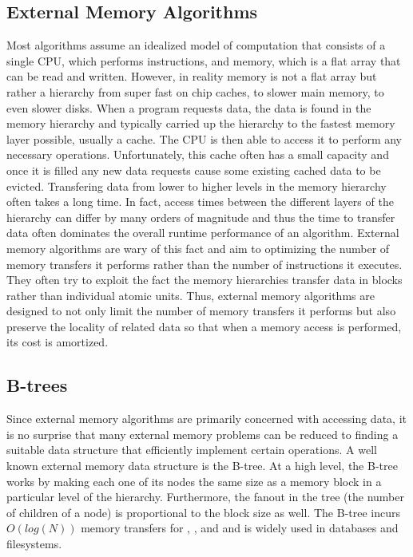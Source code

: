 \documentclass{style}
\begin{document}
\subsection{External Memory Algorithms}


Most algorithms assume an idealized model of computation that consists of a
single CPU, which performs instructions, and memory, which is a flat array
that can be read and written. However, in reality memory is not a flat array
but rather a hierarchy from super fast on chip caches, to slower main memory,
to even slower disks. When a program requests data, the data is found in the
memory hierarchy and typically carried up the hierarchy to the fastest memory
layer possible, usually a cache. The CPU is then able to access it to perform
any necessary operations. Unfortunately, this cache often has a small capacity
and once it is filled any new data requests cause some existing cached data to
be evicted. Transfering data from lower to higher levels in the memory
hierarchy often takes a long time. In fact, access times between the different
layers of the hierarchy can differ by many orders of magnitude and thus the
time to transfer data often dominates the overall runtime performance of an
algorithm. External memory algorithms are wary of this fact and aim to
optimizing the number of memory transfers it performs rather than the number
of instructions it executes. They often try to exploit the fact the memory
hierarchies transfer data in blocks rather than individual atomic units. Thus,
external memory algorithms are designed to not only limit the number of memory
transfers it performs but also preserve the locality of related data so that
when a memory access is performed, its cost is amortized.

\subsection{B-trees}

Since external memory algorithms are primarily concerned with accessing data,
it is no surprise that many external memory problems can be reduced to finding
a suitable data structure that efficiently implement certain operations. A
well known external memory data structure is the B-tree. At a high level, the
B-tree works by making each one of its nodes the same size as a memory block
in a particular level of the hierarchy. Furthermore, the fanout in the tree
(the number of children of a node) is proportional to the block size as well.
The B-tree incurs $O(log(N))$ memory transfers for \Search{}, \Insert{}, and
\Delete{} and is widely used in databases and filesystems.
\end{document}

